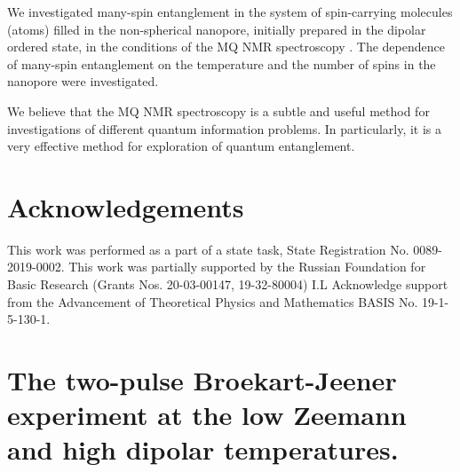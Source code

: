 \documentclass[review]{elsarticle}
\begin{document}
We investigated many-spin entanglement in the system of spin-carrying molecules (atoms) filled in the non-spherical nanopore, initially prepared in the dipolar ordered state, in the conditions of the MQ NMR spectroscopy .
The dependence of many-spin entanglement on the temperature and the number of spins in the nanopore were investigated.

We believe that the MQ NMR spectroscopy is a subtle and useful method for investigations of different quantum information problems.
In particularly, it is a very effective method for exploration of quantum entanglement.



\section{Acknowledgements}
This work was performed as a part of a state task, State Registration No. 0089-2019-0002. This work was partially supported by the Russian Foundation for Basic Research (Grants Nos. 20-03-00147, 19-32-80004) I.L Acknowledge support from the Advancement of Theoretical Physics and Mathematics BASIS No. 19-1-5-130-1.



\appendix
\section{The two-pulse Broekart-Jeener experiment at the low Zeemann and high dipolar temperatures.}
\end{document}
